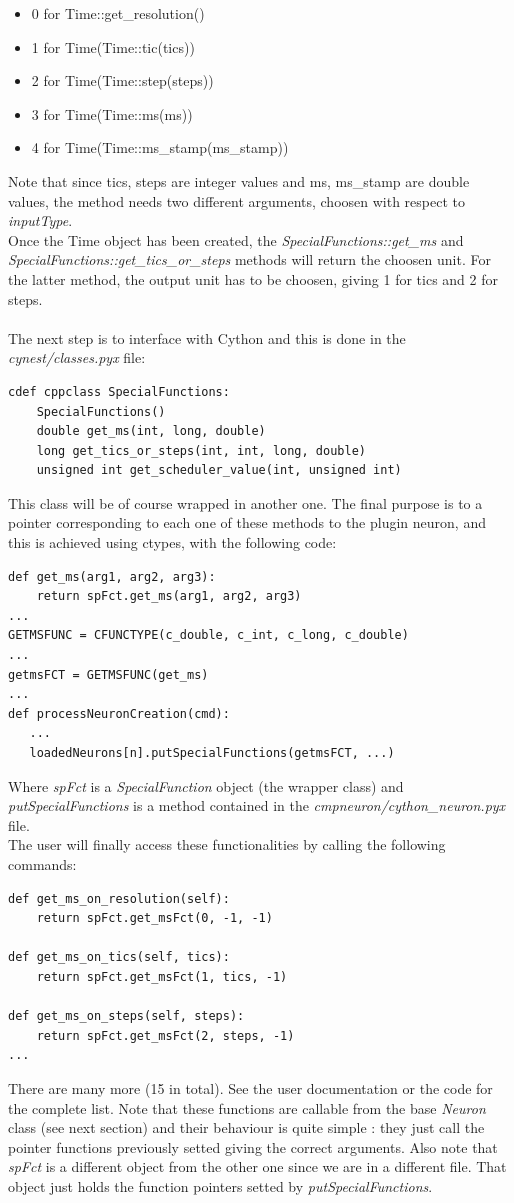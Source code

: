 \documentclass{article}
\begin{document}
\begin{itemize}
\item 0 for Time::get\_resolution()
\item 1 for Time(Time::tic(tics))
\item 2 for Time(Time::step(steps))
\item 3 for Time(Time::ms(ms))
\item 4 for Time(Time::ms\_stamp(ms\_stamp))
\end{itemize}
Note that since tics, steps are integer values and ms, ms\_stamp are double values, the method needs two different arguments, choosen with respect to \emph{inputType}.\\
Once the Time object has been created, the \emph{SpecialFunctions::get\_ms} and \emph{SpecialFunctions::get\_tics\_or\_steps} methods will return the choosen unit.
For the latter method, the output unit has to be choosen, giving 1 for tics and 2 for steps.\\ \\
The next step is to interface with Cython and this is done in the \emph{cynest/classes.pyx} file:
\begin{verbatim}
cdef cppclass SpecialFunctions:
    SpecialFunctions()
    double get_ms(int, long, double)
    long get_tics_or_steps(int, int, long, double)
    unsigned int get_scheduler_value(int, unsigned int)
\end{verbatim}
This class will be of course wrapped in another one. The final purpose is to a pointer corresponding to each one of these methods to the plugin neuron, and this is achieved using ctypes, with the following code:
\begin{verbatim}
def get_ms(arg1, arg2, arg3):
    return spFct.get_ms(arg1, arg2, arg3)
...
GETMSFUNC = CFUNCTYPE(c_double, c_int, c_long, c_double)
...
getmsFCT = GETMSFUNC(get_ms)
...
def processNeuronCreation(cmd):
   ...
   loadedNeurons[n].putSpecialFunctions(getmsFCT, ...)
\end{verbatim}
Where \emph{spFct} is a \emph{SpecialFunction} object (the wrapper class) and \emph{putSpecialFunctions} is a method contained in the \emph{cmpneuron/cython\_neuron.pyx} file.
\\
The user will finally access these functionalities by calling the following commands:
\begin{verbatim}
def get_ms_on_resolution(self):
    return spFct.get_msFct(0, -1, -1)

def get_ms_on_tics(self, tics):
    return spFct.get_msFct(1, tics, -1)

def get_ms_on_steps(self, steps):
    return spFct.get_msFct(2, steps, -1)
...
\end{verbatim}
There are many more (15 in total). See the user documentation or the code for the complete list.
Note that these functions are callable from the base \emph{Neuron} class (see next section) and their behaviour is quite simple : they just call the pointer functions previously setted giving the correct arguments. Also note that \emph{spFct} is a different object from the other one since we are in a different file. That object just holds the function pointers setted by \emph{putSpecialFunctions}.
\end{document}
